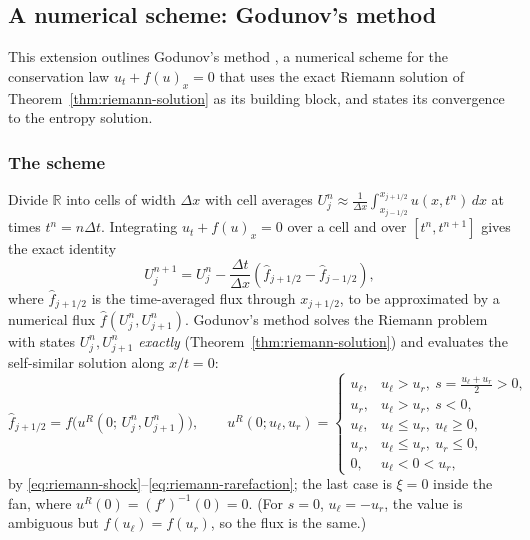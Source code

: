 
\subsection{A numerical scheme: Godunov's method}
\label{subsec:godunov}

This extension outlines Godunov's method \cite{godunov1959}, a numerical
scheme for the conservation law
$u_t+f(u)_x=0$ that uses the exact Riemann solution of
Theorem~\ref{thm:riemann-solution} as its building block, and states its
convergence to the entropy solution.

\subsubsection{The scheme}
\label{subsubsec:godunov-flux}

Divide $\mathbb{R}$ into cells of width $\Delta x$ with cell averages $U_j^n
\approx\frac1{\Delta x}\int_{x_{j-1/2}}^{x_{j+1/2}}u(x,t^n)\,dx$ at times
$t^n=n\Delta t$. Integrating $u_t+f(u)_x=0$ over a cell and over
$[t^n,t^{n+1}]$ gives the exact identity
\begin{equation}
  U_j^{n+1} = U_j^n - \frac{\Delta t}{\Delta x}
  \left( \widehat{f}_{j+1/2} - \widehat{f}_{j-1/2} \right),
\end{equation}
where $\widehat f_{j+1/2}$ is the time-averaged flux through $x_{j+1/2}$, to be
approximated by a numerical flux $\widehat f(U_j^n,U_{j+1}^n)$. Godunov's
method solves the Riemann problem with states $U_j^n,U_{j+1}^n$ \emph{exactly}
(Theorem~\ref{thm:riemann-solution}) and evaluates the self-similar solution
along $x/t=0$:
\begin{equation}
  \label{eq:godunov-flux}
  \widehat f_{j+1/2} = f\big(u^R(0;\, U_j^n, U_{j+1}^n)\big),
  \qquad
  u^R(0; u_\ell,u_r) =
  \begin{cases}
    u_\ell, & u_\ell>u_r,\ s=\tfrac{u_\ell+u_r}{2}>0, \\
    u_r, & u_\ell>u_r,\ s<0, \\
    u_\ell, & u_\ell\le u_r,\ u_\ell\ge0, \\
    u_r, & u_\ell\le u_r,\ u_r\le0, \\
    0, & u_\ell < 0 < u_r,
  \end{cases}
\end{equation}
by \eqref{eq:riemann-shock}--\eqref{eq:riemann-rarefaction}; the last case is
$\xi=0$ inside the fan, where $u^R(0)=(f')^{-1}(0)=0$. (For $s=0$,
$u_\ell=-u_r$, the value is ambiguous but $f(u_\ell)=f(u_r)$, so the flux is
the same.)


